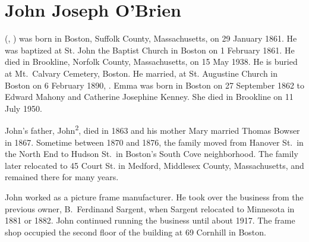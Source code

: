 \section{John Joseph O'Brien}\label{per:John3OBrien}

 (, ) was born in Boston, Suffolk County, Massachusetts, on 29 January 1861.\cite{John3OBrienBirth} He was baptized at St. John the Baptist Church in Boston on 1 February 1861.\cite{John3OBrienBaptism} He died in Brookline, Norfolk County, Massachusetts, on 15 May 1938.\cite{John3OBrienDeath} He is buried at Mt.\ Calvary Cemetery, Boston.\cite{John3OBrienBurial} He married, at St. Augustine Church in Boston on 6 February 1890, .\cite{John3OBrienMarriage,John3OBrienMarriage2} Emma was born in Boston on 27 September 1862 to Edward Mahony and Catherine Josephine Kenney.\cite{EmmaMahonyBaptism} She died in Brookline on 11 July 1950.\cite{EmmaMahonyDeath}

John's father, John\textsuperscript{2}, died in 1863\cite{John2OBrienDeath} and his mother Mary married Thomas Bowser in 1867.\cite{MaryMahoneyBowserMarriage} Sometime between 1870 and 1876, the family moved from Hanover St.\ in the North End to Hudson St.\ in Boston's South Cove neighborhood.\cite{ThomasBowser1870,ThomasBowser1876} The family later relocated to 45 Court St. in Medford, Middlesex County, Massachusetts, and remained there for many years.\cite{Census1910John3OBrien,Census1930John3OBrien}

John worked as a picture frame manufacturer.  He took over the business from the previous owner, B.\ Ferdinand Sargent, when Sargent relocated to Minnesota in 1881 or 1882.\cite{PictureFrameLabel, Sargent} John continued running the business until about 1917.\cite{John3OBrien1916} The frame shop occupied the second floor of the building at 69 Cornhill in Boston.\cite{John3OBrien1916,FrameShopFire} 

